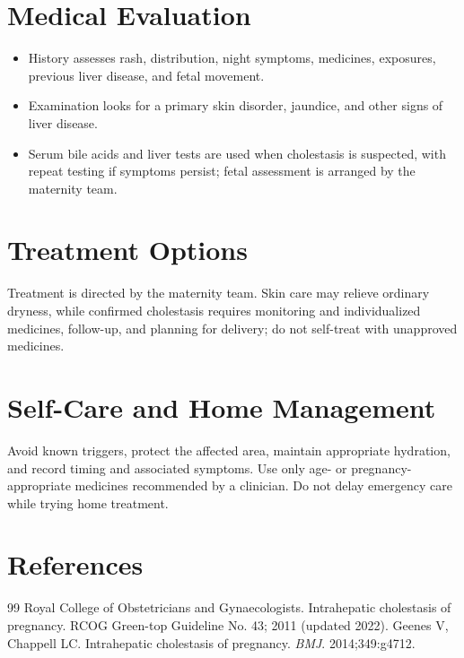 \section*{Medical Evaluation}
\begin{itemize}
  \item History assesses rash, distribution, night symptoms, medicines, exposures, previous liver disease, and fetal movement.
  \item Examination looks for a primary skin disorder, jaundice, and other signs of liver disease.
  \item Serum bile acids and liver tests are used when cholestasis is suspected, with repeat testing if symptoms persist; fetal assessment is arranged by the maternity team.
\end{itemize}

\section*{Treatment Options}
Treatment is directed by the maternity team. Skin care may relieve ordinary dryness, while confirmed cholestasis requires monitoring and individualized medicines, follow-up, and planning for delivery; do not self-treat with unapproved medicines.

\section*{Self-Care and Home Management}
Avoid known triggers, protect the affected area, maintain appropriate hydration, and record timing and associated symptoms. Use only age- or pregnancy-appropriate medicines recommended by a clinician. Do not delay emergency care while trying home treatment.

\section*{References}
\begin{thebibliography}{99}
 Royal College of Obstetricians and Gynaecologists. Intrahepatic cholestasis of pregnancy. RCOG Green-top Guideline No. 43; 2011 (updated 2022).
 Geenes V, Chappell LC. Intrahepatic cholestasis of pregnancy. \textit{BMJ}. 2014;349:g4712.
\end{thebibliography}
